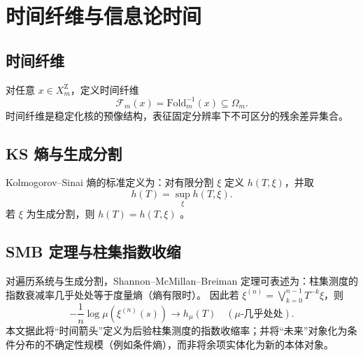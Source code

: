 \section{时间纤维与信息论时间}
\label{sec:information-time}

\subsection{时间纤维}

对任意 $x\in X_m^{\mathrm Z}$，定义时间纤维
\[
\mathcal{F}_m(x)=\mathrm{Fold}_m^{-1}(x)\subseteq\Omega_m.
\]
时间纤维是稳定化核的预像结构，表征固定分辨率下不可区分的残余差异集合。

\subsection{KS 熵与生成分割}

Kolmogorov--Sinai 熵的标准定义为：对有限分割 $\xi$ 定义 $h(T,\xi)$，并取
\[
h(T)=\sup_{\xi} h(T,\xi).
\]
若 $\xi$ 为生成分割，则 $h(T)=h(T,\xi)$ \cite{ScholarpediaKSEntropy}。

\subsection{SMB 定理与柱集指数收缩}

对遍历系统与生成分割，Shannon--McMillan--Breiman 定理可表述为：柱集测度的指数衰减率几乎处处等于度量熵（熵有限时）\cite{GatechSMB}。
因此若 $\xi^{(n)}=\bigvee_{k=0}^{n-1}T^{-k}\xi$，则
\[
-\frac{1}{n}\log\mu(\xi^{(n)}(s))\to h_\mu(T)\quad(\mu\text{-几乎处处}).
\]
本文据此将“时间箭头”定义为后验柱集测度的指数收缩率；并将“未来”对象化为条件分布的不确定性规模（例如条件熵），而非将余项实体化为新的本体对象。

